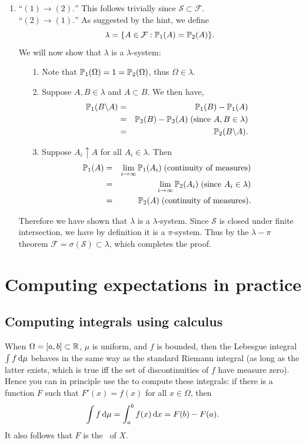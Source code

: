 \documentclass{article}
\begin{document}
\begin{enumerate}
	\item ``$(1)\rightarrow (2).$'' This follows trivially since $\mathcal{S}\subset\mathcal{F}$.\\
	\newline
	``$(2)\rightarrow (1).$'' As suggested by the hint, we define 
	\[\lambda=\{A\in\mathcal{F}:\P_1(A)=\P_2(A)\}.\]
	We will now show that $\lambda$ is a $\lambda$-system:
	\begin{enumerate}
		\item [1.] Note that $\P_1(\Omega)=1=\P_2(\Omega)$, thus $\Omega\in \lambda$.
		\item [2.] Suppose $A,B\in\lambda$ and $A\subset B$. We then have,
			\begin{eqnarray*}
			\P_1(B\backslash A)&=&\P_1(B)-\P_1(A) \\
			&=& \P_2(B)-\P_2(A) \;\text{(since }A,B\in\lambda) \\
			&=& \P_2(B\backslash A).
			\end{eqnarray*}
		\item [3.] Suppose $A_i\uparrow A$ for all $A_i\in\lambda$. Then
			\begin{eqnarray*}
			\P_1(A)&=&\lim_{i\to\infty} \P_1(A_i) \;\text{(continuity of measures}) \\
			&=& \lim_{i\to\infty}\P_2(A_i) \;\text{(since }A_i\in\lambda) \\
			&=&\P_2(A) \;\text{(continuity of measures}). \\
			\end{eqnarray*}
	\end{enumerate}
	Therefore we have shown that $\lambda$ is a $\lambda$-system. Since $\mathcal{S}$ is closed under finite intersection, we have by definition it is a $\pi$-system. Thus by the $\lambda-\pi$ theorem $\mathcal{F}=\sigma(\mathcal{S})\subset\lambda$, which completes the proof.
\end{enumerate}



\section{Computing expectations in practice}

\subsection{Computing integrals using calculus}\label{sec:calculus}

When $\Omega = [a, b] \subset \R$, $\mu$ is uniform, and $f$ is bounded, then the Lebesgue integral $\int f \ud \mu$ behaves in the same way as the standard Riemann integral (as long as the latter exists, which is true iff the set of discontinuities of $f$ have measure zero). Hence you can in principle use the  to compute these integrals: if there is a function $F$ such that $F'(x) = f(x)$ for all $x \in \Omega$, then 
\[ \int f \ud \mu = \int_a^b f(x) \ud x = F(b) - F(a). \]
It also follows that $F$ is the \CDF\ of $X$.  
\end{document}
